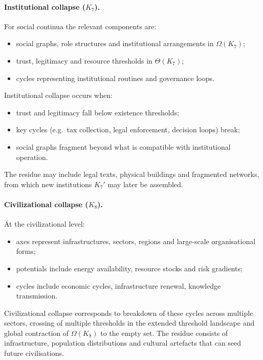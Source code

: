 \paragraph{Institutional collapse (\texorpdfstring{\(K_7\)}{K_7}).}
For social continua the relevant components are:
\begin{itemize}
  \item social graphs, role structures and institutional arrangements in
        \(\Omega(K_7)\);
  \item trust, legitimacy and resource thresholds in \(\Theta(K_7)\);
  \item cycles representing institutional routines and governance loops.
\end{itemize}
Institutional collapse occurs when:
\begin{itemize}
  \item trust and legitimacy fall below existence thresholds;
  \item key cycles (e.g.\ tax collection, legal enforcement, decision loops)
        break;
  \item social graphs fragment beyond what is compatible with institutional
        operation.
\end{itemize}
The residue may include legal texts, physical buildings and fragmented
networks, from which new institutions \(K_7'\) may later be assembled.

\paragraph{Civilizational collapse (\texorpdfstring{\(K_8\)}{K_8}).}
At the civilizational level:
\begin{itemize}
  \item axes represent infrastructures, sectors, regions and large-scale
        organisational forms;
  \item potentials include energy availability, resource stocks and risk
        gradients;
  \item cycles include economic cycles, infrastructure renewal, knowledge
        transmission.
\end{itemize}
Civilizational collapse corresponds to breakdown of these cycles across
multiple sectors, crossing of multiple thresholds in the extended threshold
landscape and global contraction of \(\Omega(K_8)\) to the empty set. The
residue consists of infrastructure, population distributions and cultural
artefacts that can seed future civilisations.

